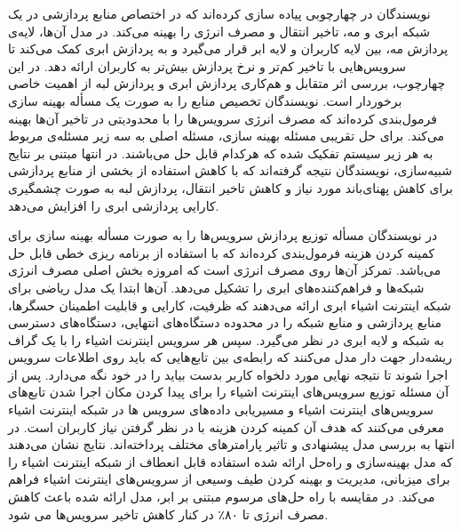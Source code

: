     نویسندگان در \cite{deng2016optimal} چهارچوبی پیاده سازی کرده‌اند که در اختصاص منابع پردازشی در یک شبکه ابری و مه، تاخیر انتقال و مصرف انرژی را بهینه می‌کند.
    در مدل آن‌ها، لایه‌ی پردازش مه، بین لایه کاربران و لایه‌ ابر قرار می‌گیرد و به پردازش ابری کمک می‌کند تا سرویس‌هایی با تاخیر کم‌تر و نرخ پردازش بیش‌تر به کاربران ارائه دهد.
    در این چهارچوب، بررسی اثر متقابل و هم‌کاری پردازش ابری و پردازش لبه از اهمیت خاصی برخوردار است.
    نویسندگان تخصیص منابع را به صورت یک مسأله بهینه سازی فرمول‌بندی کرده‌اند که مصرف انرژی سرویس‌ها را با محدودیتی در تاخیر آن‌ها بهینه می‌کند.
    برای حل تقریبی مسئله بهینه سازی، مسئله اصلی به سه زیر مسئله‌ی مربوط به هر زیر سیستم تفکیک شده که هرکدام قابل حل می‌باشند.
    در انتها مبتنی بر نتایج شبیه‌سازی، نویسندگان نتیجه گرفته‌اند که با کاهش استفاده از بخشی از منابع پردازشی برای کاهش پهنای‌باند مورد نیاز و کاهش تاخیر انتقال، پردازش لبه به صورت چشمگیری کارایی پردازشی ابری را افزایش می‌دهد.

    در \cite{barcelo2016iot} نویسندگان مسأله توزیع پردازش سرویس‌ها‌ را به صورت مسأله بهینه سازی برای کمینه کردن هزینه فرمول‌بندی کرده‌اند که با استفاده از برنامه ریزی خطی قابل حل می‌باشد.
    تمرکز آن‌ها روی مصرف انرژی است که امروزه بخش اصلی مصرف انرژی شبکه‌ها و فراهم‌کننده‌های ابری را تشکیل می‌دهد.
    آن‌ها ابتدا یک مدل ریاضی برای شبکه اینترنت اشیاء ابری ارائه می‌دهند که ظرفیت، کارایی و قابلیت اطمینان حسگر‌ها، منابع پردازشی و منابع شبکه را در محدوده دستگاه‌های انتهایی، دستگاه‌های دسترسی به شبکه و لایه ابری در نظر می‌گیرد.
    سپس هر سرویس اینترنت اشیاء را با یک گراف ریشه‌دار جهت دار مدل می‌کنند که رابطه‌ی بین تابع‌هایی که باید روی اطلاعات سرویس اجرا شوند تا نتیجه نهایی مورد دلخواه کاربر بدست بیاید را در خود نگه می‌دارد.
    پس از آن مسئله توزیع سرویس‌های اینترنت اشیاء را برای پیدا کردن مکان اجرا شدن تابع‌های سرویس‌های اینترنت اشیاء و مسیریابی داده‌های سرویس ها در شبکه اینترنت اشیاء معرفی می‌کنند که هدف آن کمینه کردن هزینه با در نظر گرفتن نیاز کاربران است.
    در انتها به بررسی مدل پیشنهادی و تاثیر پارامتر‌های مختلف پرداخته‌اند. 
    نتایج نشان می‌دهند که مدل بهینه‌سازی و راه‌حل ارائه شده استفاده قابل انعطاف از شبکه اینترنت اشیاء را برای میزبانی، مدیریت و بهینه کردن طیف وسیعی از سرویس‌های اینترنت اشیاء فراهم می‌کند.
    در مقایسه با راه حل‌های مرسوم مبتنی بر ابر، مدل ارائه شده باعث کاهش مصرف انرژی تا ۸۰٪ در کنار کاهش تاخیر سرویس‌ها می شود.
    
